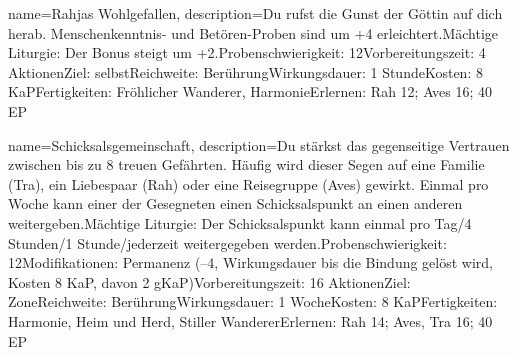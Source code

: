 {
    name={Rahjas Wohlgefallen},
    description={Du rufst die Gunst der Göttin auf dich herab. Menschenkenntnis- und Betören-Proben sind um +4 erleichtert.\newline Mächtige Liturgie: Der Bonus steigt um +2.\newline Probenschwierigkeit: 12\newline Vorbereitungszeit: 4 Aktionen\newline Ziel: selbst\newline Reichweite: Berührung\newline Wirkungsdauer: 1 Stunde\newline Kosten: 8 KaP\newline Fertigkeiten: Fröhlicher Wanderer, Harmonie\newline Erlernen: Rah 12; Aves 16; 40 EP}
}


{
    name={Schicksalsgemeinschaft},
    description={Du stärkst das gegenseitige Vertrauen zwischen bis zu 8 treuen Gefährten. Häufig wird dieser Segen auf eine Familie (Tra), ein Liebespaar (Rah) oder eine Reisegruppe (Aves) gewirkt. Einmal pro Woche kann einer der Gesegneten einen Schicksalspunkt an einen anderen weitergeben.\newline Mächtige Liturgie: Der Schicksalspunkt kann einmal pro Tag/4 Stunden/1 Stunde/jederzeit weitergegeben werden.\newline Probenschwierigkeit: 12\newline Modifikationen: Permanenz (–4, Wirkungsdauer bis die Bindung gelöst wird, Kosten 8 KaP, davon 2 gKaP)\newline Vorbereitungszeit: 16 Aktionen\newline Ziel: Zone\newline Reichweite: Berührung\newline Wirkungsdauer: 1 Woche\newline Kosten: 8 KaP\newline Fertigkeiten: Harmonie, Heim und Herd, Stiller Wanderer\newline Erlernen: Rah 14; Aves, Tra 16; 40 EP}
}


